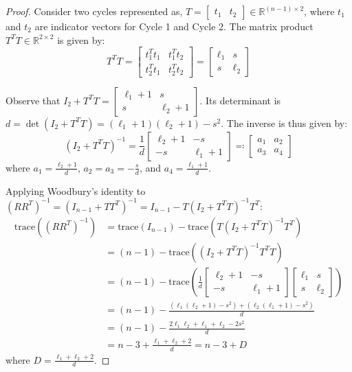 \begin{proof}
Consider two cycles represented as, $T = \begin{bmatrix} t_1 & t_2 \end{bmatrix} \in \mathbb{R}^{(n-1) \times 2}$, where $t_1$ and $t_2$ are indicator vectors for Cycle 1 and Cycle 2. The matrix product $T^T T \in \mathbb{R}^{2 \times 2}$ is given by:
\begin{equation}\label{eq:ch_RA_TTT_2cycle}
	T^T T = \begin{bmatrix} t_1^T t_1 & t_1^T t_2 \\ t_2^T t_1 & t_2^T t_2 \end{bmatrix} = \begin{bmatrix} \ell_1 & s \\ s & \ell_2 \end{bmatrix}
\end{equation}

Observe that $I_2 + T^T T = \begin{bmatrix} \ell_1+1 & s \\ s & \ell_2+1 \end{bmatrix}$. Its determinant is $d = \det(I_2 + T^T T) = (\ell_1+1)(\ell_2+1) - s^2$. The inverse is thus given by:
\begin{equation}\label{eq:ch_RA_I_TTT_inv}
	(I_2 + T^T T)^{-1} = \frac{1}{d} \begin{bmatrix} \ell_2+1 & -s \\ -s & \ell_1+1 \end{bmatrix} \eqcolon \begin{bmatrix} a_1 & a_2 \\ a_3 & a_4 \end{bmatrix}
\end{equation}
where $a_1 = \frac{\ell_2+1}{d}$, $a_2 = a_3 = -\frac{s}{d}$, and $a_4 = \frac{\ell_1+1}{d}$.

Applying Woodbury's identity to $(R R^T)^{-1} = (I_{n-1} + T T^T)^{-1} = I_{n-1} - T (I_2 + T^T T)^{-1} T^T$:
\begin{align}\label{eq:ch_RA_RRT_inv_2cycle}
	\text{trace}\left((R R^T)^{-1}\right) &= \text{trace}(I_{n-1}) - \text{trace}\left( T (I_2 + T^T T)^{-1} T^T \right) \nonumber \\
	&= (n-1) - \text{trace}\left( (I_2 + T^T T)^{-1} T^T T \right) \nonumber \\
	&= (n-1) - \text{trace}\left( \frac{1}{d} \begin{bmatrix} \ell_2+1 & -s \\ -s & \ell_1+1 \end{bmatrix} \begin{bmatrix} \ell_1 & s \\ s & \ell_2 \end{bmatrix} \right) \nonumber \\
	&= (n-1) - \frac{(\ell_1(\ell_2+1) - s^2) + (\ell_2(\ell_1+1) - s^2)}{d} \nonumber \\
	&= (n-1) - \frac{2\ell_1 \ell_2 + \ell_1 + \ell_2 - 2s^2}{d} \nonumber \\
	&= n - 3 + \frac{\ell_1 + \ell_2 + 2}{d} = n - 3 + D
\end{align}
where $D = \frac{\ell_1 + \ell_2 + 2}{d}$.


\end{proof}
